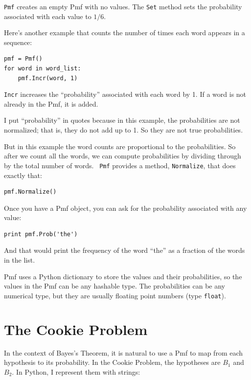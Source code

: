 \documentclass[12pt]{book}
\begin{document}
\verb"Pmf" creates an empty Pmf with no values.  The
\verb"Set" method sets the probability associated with each
value to $1/6$.

Here's another example that counts the number of times each word
appears in a sequence:

\begin{verbatim}
pmf = Pmf()
for word in word_list:
    pmf.Incr(word, 1)
\end{verbatim}

\verb"Incr" increases the ``probability'' associated with each
word by 1.  If a word is not already in the Pmf, it is added.

I put ``probability'' in quotes because in this example, the
probabilities are not normalized; that is, they do not add up to 1.
So they are not true probabilities.

But in this example the word counts are proportional to the
probabilities.  So after we count all the words, we can compute
probabilities by dividing through by the total number of words.  {\tt
  Pmf} provides a method, \verb"Normalize", that does exactly that:

\begin{verbatim}
pmf.Normalize()
\end{verbatim}

Once you have a Pmf object, you can ask for the probability
associated with any value:

\begin{verbatim}
print pmf.Prob('the')
\end{verbatim}

And that would print the frequency of the word ``the'' as a fraction
of the words in the list.

Pmf uses a Python dictionary to store the values and their
probabilities, so the values in the Pmf can be any hashable type.
The probabilities can be any numerical type, but they are usually
floating point numbers (type \verb"float").


\section{The Cookie Problem}

In the context of Bayes's Theorem, it is natural to use a Pmf
to map from each hypothesis to its probability.  In the Cookie
Problem, the hypotheses are $B_1$ and $B_2$.  In Python, I
represent them with strings:
\end{document}
